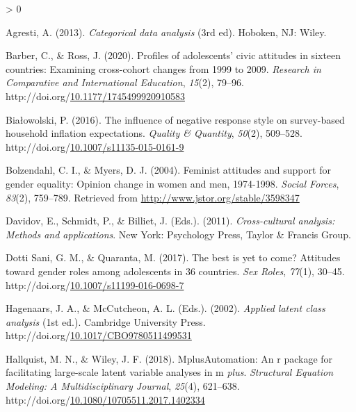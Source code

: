 \documentclass[12pt,twoside]{reedthesis}
\newlength{\cslhangindent}
\newenvironment{CSLReferences}[2] %
 {%
  \setlength{\parindent}{0pt}
  \ifodd #1 \everypar{\setlength{\hangindent}{\cslhangindent}}\ignorespaces\fi
  \ifnum #2 > 0
  \setlength{\parskip}{#2\baselineskip}
  \fi
 }%
 {}
\begin{document}
\hypertarget{refs}{}
\begin{CSLReferences}{1}{0}
\leavevmode\hypertarget{ref-agresti_categorical_2013}{}%
Agresti, A. (2013). \emph{Categorical data analysis} (3rd ed). Hoboken, {NJ}: Wiley.

\leavevmode\hypertarget{ref-barber_profiles_2020}{}%
Barber, C., \& Ross, J. (2020). Profiles of adolescents' civic attitudes in sixteen countries: Examining cross-cohort changes from 1999 to 2009. \emph{Research in Comparative and International Education}, \emph{15}(2), 79--96. http://doi.org/\href{https://doi.org/10.1177/1745499920910583}{10.1177/1745499920910583}

\leavevmode\hypertarget{ref-bialowolski_influence_2016}{}%
Białowolski, P. (2016). The influence of negative response style on survey-based household inflation expectations. \emph{Quality \& Quantity}, \emph{50}(2), 509--528. http://doi.org/\href{https://doi.org/10.1007/s11135-015-0161-9}{10.1007/s11135-015-0161-9}

\leavevmode\hypertarget{ref-bolzendahl_feminist_2004}{}%
Bolzendahl, C. I., \& Myers, D. J. (2004). Feminist attitudes and support for gender equality: Opinion change in women and men, 1974-1998. \emph{Social Forces}, \emph{83}(2), 759--789. Retrieved from \url{http://www.jstor.org/stable/3598347}

\leavevmode\hypertarget{ref-davidov_cross-cultural_2011}{}%
Davidov, E., Schmidt, P., \& Billiet, J. (Eds.). (2011). \emph{Cross-cultural analysis: Methods and applications}. New York: Psychology Press, Taylor \& Francis Group.

\leavevmode\hypertarget{ref-dotti_sani_best_2017}{}%
Dotti Sani, G. M., \& Quaranta, M. (2017). The best is yet to come? Attitudes toward gender roles among adolescents in 36 countries. \emph{Sex Roles}, \emph{77}(1), 30--45. http://doi.org/\href{https://doi.org/10.1007/s11199-016-0698-7}{10.1007/s11199-016-0698-7}

\leavevmode\hypertarget{ref-hagenaars_applied_2002}{}%
Hagenaars, J. A., \& McCutcheon, A. L. (Eds.). (2002). \emph{Applied latent class analysis} (1st ed.). Cambridge University Press. http://doi.org/\href{https://doi.org/10.1017/CBO9780511499531}{10.1017/CBO9780511499531}

\leavevmode\hypertarget{ref-hallquist_mplusautomation_2018}{}%
Hallquist, M. N., \& Wiley, J. F. (2018). {MplusAutomation}: An r package for facilitating large-scale latent variable analyses in m \emph{plus}. \emph{Structural Equation Modeling: A Multidisciplinary Journal}, \emph{25}(4), 621--638. http://doi.org/\href{https://doi.org/10.1080/10705511.2017.1402334}{10.1080/10705511.2017.1402334}


\end{CSLReferences}
\end{document}
